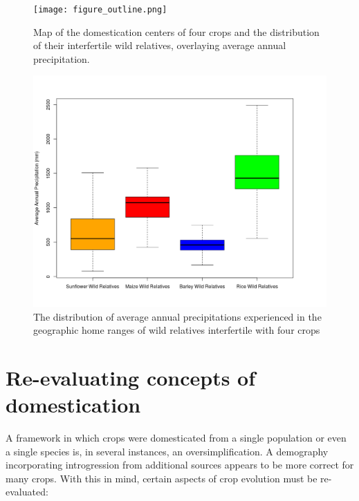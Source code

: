 \documentclass[11pt]{article}
\begin{document}
\begin{figure}[h]
	\centering
	\texttt{[image: figure\_outline.png]}
	\caption{Map of the domestication centers of four crops and the distribution of their interfertile wild relatives, overlaying average annual precipitation.}
	\label{boxplot:map}
\end{figure}

\begin{figure}[h]
	\centering
	\includegraphics[width=17.35cm]{boxplot.png}
	\caption{The distribution of average annual precipitations experienced in the geographic home ranges of wild relatives interfertile with four crops}
	\label{fig:map}
\end{figure}



























\section*{Re-evaluating concepts of domestication}
A framework in which crops were domesticated from a single population or even a single species is, in several instances, an oversimplification.
A demography incorporating introgression from additional sources appears to be more correct for many crops.
With this in mind, certain aspects of crop evolution must be re-evaluated:
\end{document}
